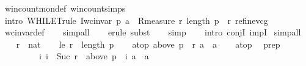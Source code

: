 \begin{isabellebody}
\ win{\isacharunderscore}{\kern0pt}count{\isacharunderscore}{\kern0pt}mon{\isacharunderscore}{\kern0pt}def\ win{\isacharunderscore}{\kern0pt}count{\isachardot}{\kern0pt}simps\isanewline
\ \ \isamarkupfalse%
\ {\isacharparenleft}{\kern0pt}intro\ WHILET{\isacharunderscore}{\kern0pt}rule{\isacharbrackleft}{\kern0pt}\ I{\isacharequal}{\kern0pt}{\isachardoublequoteopen}{\isacharparenleft}{\kern0pt}wc{\isacharunderscore}{\kern0pt}invar\ p\ a{\isacharparenright}{\kern0pt}{\isachardoublequoteclose}\ \ R{\isacharequal}{\kern0pt}{\isachardoublequoteopen}measure\ {\isacharparenleft}{\kern0pt}{\isasymlambda}{\isacharparenleft}{\kern0pt}r{\isacharcomma}{\kern0pt}{\isacharunderscore}{\kern0pt}{\isacharparenright}{\kern0pt}{\isachardot}{\kern0pt}\ {\isacharparenleft}{\kern0pt}length\ p{\isacharparenright}{\kern0pt}\ {\isacharminus}{\kern0pt}\ r{\isacharparenright}{\kern0pt}{\isachardoublequoteclose}{\isacharbrackright}{\kern0pt}\ refine{\isacharunderscore}{\kern0pt}vcg{\isacharparenright}{\kern0pt}\isanewline
\ \ \isamarkupfalse%
\ wc{\isacharunderscore}{\kern0pt}invar{\isacharunderscore}{\kern0pt}def\isanewline
\ \ \isamarkupfalse%
\ {\isacharparenleft}{\kern0pt}simp{\isacharunderscore}{\kern0pt}all{\isacharparenright}{\kern0pt}\isanewline
\ \ \isamarkupfalse%
\ {\isacharparenleft}{\kern0pt}erule\ subst{\isacharparenright}{\kern0pt}\isanewline
\ \ \isamarkupfalse%
\ {\isacharparenleft}{\kern0pt}simp{\isacharparenright}{\kern0pt}\isanewline
\ \ \isamarkupfalse%
\ {\isacharparenleft}{\kern0pt}intro\ conjI\ impI{\isacharparenright}{\kern0pt}\isanewline
{}\isamarkupfalse%
\ {\isacharparenleft}{\kern0pt}simp{\isacharunderscore}{\kern0pt}all{\isacharparenright}{\kern0pt}\isanewline
\ \ \isamarkupfalse%
\ r\ {\isacharcolon}{\kern0pt}{\isacharcolon}{\kern0pt}\ nat\isanewline
\ \ \isamarkupfalse%
\ le{\isacharcolon}{\kern0pt}\ {\isachardoublequoteopen}r\ {\isacharless}{\kern0pt}\ length\ p{\isachardoublequoteclose}\isanewline
\ \ \isamarkupfalse%
\ atop{\isacharcolon}{\kern0pt}\ {\isachardoublequoteopen}above\ {\isacharparenleft}{\kern0pt}p\ {\isacharbang}{\kern0pt}\ r{\isacharparenright}{\kern0pt}\ a\ {\isacharequal}{\kern0pt}\ {\isacharbraceleft}{\kern0pt}a{\isacharbraceright}{\kern0pt}{\isachardoublequoteclose}\isanewline
\ \ \isamarkupfalse%
\ atop\ \isamarkupfalse%
\ prep{\isacharcolon}{\kern0pt}\ \isanewline
\ \ \ \ \ \ \ \ \ {\isachardoublequoteopen}{\isacharbraceleft}{\kern0pt}i{\isachardot}{\kern0pt}\ i\ {\isacharless}{\kern0pt}\ Suc\ r\ {\isasymand}\ above\ {\isacharparenleft}{\kern0pt}p\ {\isacharbang}{\kern0pt}\ i{\isacharparenright}{\kern0pt}\ a\ {\isacharequal}{\kern0pt}\ {\isacharbraceleft}{\kern0pt}a{\isacharbraceright}{\kern0pt}{\isacharbraceright}{\kern0pt}\ \isanewline

\end{isabellebody}
